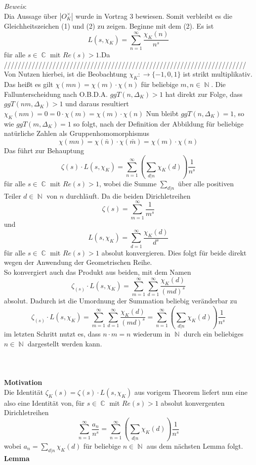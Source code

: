 \documentclass[10pt,a4paper]{article}
\DeclareMathOperator{\C}{\mathbb{C}}
\DeclareMathOperator{\N}{\mathbb{N}}
\begin{document}
\\
\\
 \textit{Beweis}:
 \\
 Dia Aussage über $|O_K^\times|$ wurde in Vortrag 3 bewiesen. Somit verbleibt es die Gleichheitszeichen (1) und (2) zu zeigen. Beginne mit dem (2). Es ist $$L(s,\chi_K)=\sum_{n=1}^{\infty}\frac{\chi_K(n)}{n^s}$$ für alle $s \in \C$ mit $Re(s) > 1$.Da //////////////////////////////////////////////////////////////////////
 \\
Von Nutzen hierbei, ist die Beobachtung $\chi_K \colon \rightarrow \{-1,0,1\}$ ist strikt multiplikativ. Das heißt es gilt $\chi(mn)=\chi(m)\cdot\chi(n)$ für beliebige $m,n \in \N$. Die Fallunterscheidung nach O.B.D.A. $ggT(n,\Delta_K)>1$ hat direkt zur Folge, dass $ggT(nm,\Delta_K)>1$ und daraus resultiert $\chi_K(nm)=0=0\cdot \chi(m)= \chi(m)\cdot \chi(n)$
Nun bleibt $ggT(n,\Delta_K)=1$, so wie $ggT(m,\Delta_K)=1$ so folgt, nach der Definition der Abbildung für beliebige natürliche Zahlen als Gruppenhomomorphismus $$\chi(mn)=\chi(\bar{n})\cdot \chi(\bar{m})= \chi(m)\cdot \chi(n)$$
 Das führt zur Behauptung $$\zeta(s)\cdot L(s,\chi_K) = \sum_{n=1}^{\infty}(\sum_{d|n}\chi_K(d))\frac{1}{n^s}$$ für alle $s \in \C$ mit $Re(s) >1$, wobei die Summe $\sum_{d|n}$ über alle positiven Teiler $d \in \N$ von $n$ durchläuft. Da die beiden Dirichletreihen $$\zeta(s) = \sum_{m=1}^{\infty}\frac{1}{m^s} $$ und $$L(s,\chi_K)= \sum_{d=1}^{\infty}\frac{\chi_K(d)}{d^s}$$ für alle $s \in \C$ mit $Re(s) >1$ absolut konvergieren. Dies folgt für beide direkt wegen der Anwendung der Geometrischen Reihe.
 \\
 So konvergiert auch das Produkt aus beiden, mit dem Namen $$\zeta_(s) \cdot L(s,\chi_K) = \sum_{m=1}^{\infty} \sum_{d=1}^{\infty}\frac{\chi_K(d)}{(md)^s}$$ absolut.
 Dadurch ist die Umordnung der Summation beliebig veränderbar zu $$\zeta_(s) \cdot L(s,\chi_K)=\sum_{m=1}^{\infty} \sum_{d=1}^{\infty}\frac{\chi_K(d)}{(md)^s}= \sum_{n=1}^{\infty}(\sum_{d|n}\chi_K(d))\frac{1}{n^s}$$ im letzten Schritt nutzt es, dass $n \cdot m = n$ wiederum in $\N$ durch ein beliebiges $n \in \N$ dargestellt werden kann.
 \\
 \\
 \\
 \\
 \textbf{Motivation}
 \\
Die Identität  $\zeta_K(s) = \zeta(s)\cdot L(s,\chi_K) $ aus vorigem Theorem liefert nun eine also eine Identität von, für $s \in \C$ mit $Re(s) > 1$ absolut konvergenten Dirichletreihen$$ \sum_{n=1}^{\infty}\frac{a_n}{n^s}= \sum_{n=1}^{\infty}(\sum_{d|n}\chi_K(d))\frac{1}{n^s}$$
wobei $a_n = \sum_{d|n}\chi_K(d)$ für beliebige $n \in \N$ aus dem nächsten Lemma folgt.
 \\
 \textbf{Lemma}
 \\
 
\end{document}

